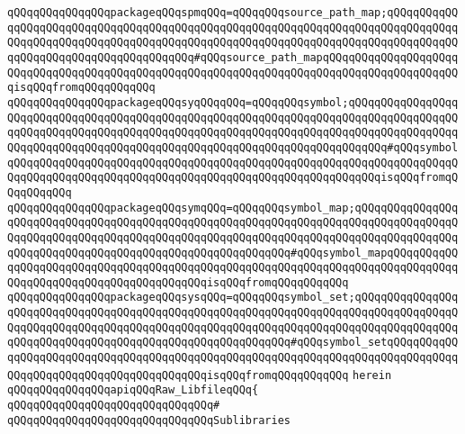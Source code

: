 \verb|qQQqqQQqqQQqqQQqpackageqQQqspmqQQq=qQQqqQQqsource_path_map;qQQqqQQqqQQqqQQqqQQqqQQqqQQqqQQqqQQqqQQqqQQqqQQqqQQqqQQqqQQqqQQqqQQqqQQqqQQqqQQqqQQqqQQqqQQqqQQqqQQqqQQqqQQqqQQqqQQqqQQqqQQqqQQqqQQqqQQqqQQqqQQqqQQqqQQqqQQqqQQqqQQqqQQqqQQqqQQqqQQq#qQQqsource_path_mapqQQqqQQqqQQqqQQqqQQqqQQqqQQqqQQqqQQqqQQqqQQqqQQqqQQqqQQqqQQqqQQqqQQqqQQqqQQqqQQqqQQqqQQqqQQqisqQQqfromqQQqqQQqqQQq|\newline
\verb|qQQqqQQqqQQqqQQqpackageqQQqsyqQQqqQQq=qQQqqQQqsymbol;qQQqqQQqqQQqqQQqqQQqqQQqqQQqqQQqqQQqqQQqqQQqqQQqqQQqqQQqqQQqqQQqqQQqqQQqqQQqqQQqqQQqqQQqqQQqqQQqqQQqqQQqqQQqqQQqqQQqqQQqqQQqqQQqqQQqqQQqqQQqqQQqqQQqqQQqqQQqqQQqqQQqqQQqqQQqqQQqqQQqqQQqqQQqqQQqqQQqqQQqqQQqqQQqqQQqqQQq#qQQqsymbolqQQqqQQqqQQqqQQqqQQqqQQqqQQqqQQqqQQqqQQqqQQqqQQqqQQqqQQqqQQqqQQqqQQqqQQqqQQqqQQqqQQqqQQqqQQqqQQqqQQqqQQqqQQqqQQqqQQqqQQqqQQqqQQqisqQQqfromqQQqqQQqqQQq|\newline
\verb|qQQqqQQqqQQqqQQqpackageqQQqsymqQQq=qQQqqQQqsymbol_map;qQQqqQQqqQQqqQQqqQQqqQQqqQQqqQQqqQQqqQQqqQQqqQQqqQQqqQQqqQQqqQQqqQQqqQQqqQQqqQQqqQQqqQQqqQQqqQQqqQQqqQQqqQQqqQQqqQQqqQQqqQQqqQQqqQQqqQQqqQQqqQQqqQQqqQQqqQQqqQQqqQQqqQQqqQQqqQQqqQQqqQQqqQQqqQQqqQQqqQQq#qQQqsymbol_mapqQQqqQQqqQQqqQQqqQQqqQQqqQQqqQQqqQQqqQQqqQQqqQQqqQQqqQQqqQQqqQQqqQQqqQQqqQQqqQQqqQQqqQQqqQQqqQQqqQQqqQQqqQQqqQQqisqQQqfromqQQqqQQqqQQq|\newline
\verb|qQQqqQQqqQQqqQQqpackageqQQqsysqQQq=qQQqqQQqsymbol_set;qQQqqQQqqQQqqQQqqQQqqQQqqQQqqQQqqQQqqQQqqQQqqQQqqQQqqQQqqQQqqQQqqQQqqQQqqQQqqQQqqQQqqQQqqQQqqQQqqQQqqQQqqQQqqQQqqQQqqQQqqQQqqQQqqQQqqQQqqQQqqQQqqQQqqQQqqQQqqQQqqQQqqQQqqQQqqQQqqQQqqQQqqQQqqQQqqQQqqQQq#qQQqsymbol_setqQQqqQQqqQQqqQQqqQQqqQQqqQQqqQQqqQQqqQQqqQQqqQQqqQQqqQQqqQQqqQQqqQQqqQQqqQQqqQQqqQQqqQQqqQQqqQQqqQQqqQQqqQQqqQQqisqQQqfromqQQqqQQqqQQq|\newline
\verb|herein|\newline
\newline
\verb|qQQqqQQqqQQqqQQqapiqQQqRaw_LibfileqQQq{|\newline
\verb|qQQqqQQqqQQqqQQqqQQqqQQqqQQqqQQq#|\newline
\newline
\verb|qQQqqQQqqQQqqQQqqQQqqQQqqQQqqQQqSublibraries|\newline
